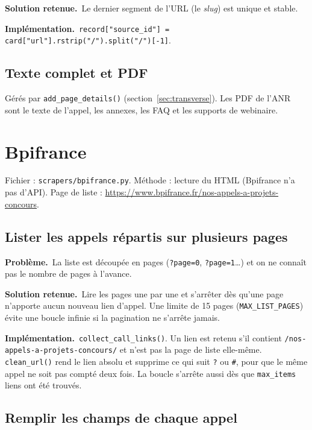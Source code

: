\documentclass[11pt,a4paper]{article}
\newcommand{\pb}{\par\medskip\noindent\textbf{\textcolor{pbcolor}{Problème.}}\ }
\newcommand{\sol}{\par\medskip\noindent\textbf{\textcolor{solcolor}{Solution retenue.}}\ }
\newcommand{\impl}{\par\medskip\noindent\textbf{\textcolor{implcolor}{Implémentation.}}\ }
\newcommand{\code}[1]{\texttt{#1}}
\begin{document}
\sol Le dernier segment de l'URL (le \emph{slug}) est unique et stable.

\impl \code{record["source\_id"] = card["url"].rstrip("/").split("/")[-1]}.

\subsection{Texte complet et PDF}

Gérés par \code{add\_page\_details()} (section~\ref{sec:transverse}). Les PDF de l'ANR
sont le texte de l'appel, les annexes, les FAQ et les supports de webinaire.

\section{Bpifrance}
\label{sec:bpifrance}

Fichier : \code{scrapers/bpifrance.py}. Méthode : lecture du HTML (Bpifrance n'a pas
d'API). Page de liste : \url{https://www.bpifrance.fr/nos-appels-a-projets-concours}.

\subsection{Lister les appels répartis sur plusieurs pages}

\pb La liste est découpée en pages (\code{?page=0}, \code{?page=1}\dots) et on ne connaît
pas le nombre de pages à l'avance.

\sol Lire les pages une par une et s'arrêter dès qu'une page n'apporte aucun nouveau lien
d'appel. Une limite de 15 pages (\code{MAX\_LIST\_PAGES}) évite une boucle infinie si la
pagination ne s'arrête jamais.

\impl \code{collect\_call\_links()}. Un lien est retenu s'il contient
\code{/nos-appels-a-projets-concours/} et n'est pas la page de liste elle-même.
\code{clean\_url()} rend le lien absolu et supprime ce qui suit \code{?} ou \code{\#}, pour
que le même appel ne soit pas compté deux fois. La boucle s'arrête aussi dès que
\code{max\_items} liens ont été trouvés.

\subsection{Remplir les champs de chaque appel}
\end{document}
